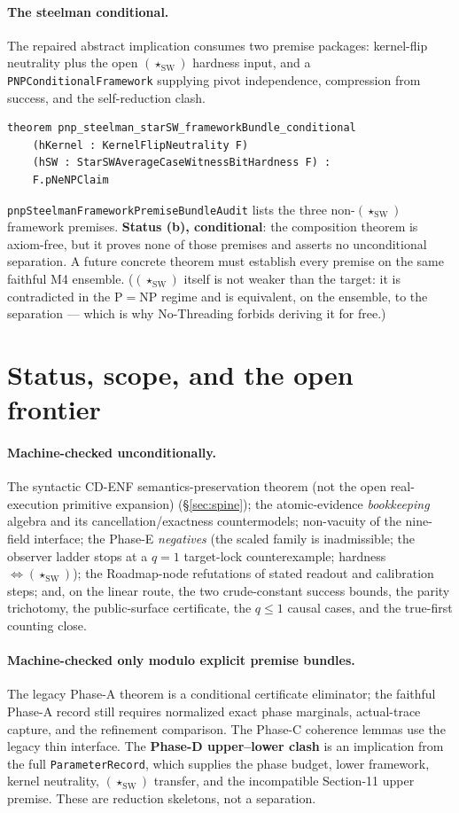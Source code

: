 \documentclass[11pt]{article}
\theoremstyle{definition}
\newcommand{\StarSW}{(\star_{\mathrm{SW}})}
\begin{document}
\paragraph{The steelman conditional.} The repaired abstract implication consumes
two premise packages: kernel-flip neutrality plus the open $\StarSW$ hardness
input, and a \texttt{PNPConditionalFramework} supplying pivot independence,
compression from success, and the self-reduction clash.
\begin{lstlisting}
theorem pnp_steelman_starSW_frameworkBundle_conditional
    (hKernel : KernelFlipNeutrality F)
    (hSW : StarSWAverageCaseWitnessBitHardness F) :
    F.pNeNPClaim
\end{lstlisting}
\texttt{pnpSteelmanFrameworkPremiseBundleAudit} lists the three non-$\StarSW$
framework premises.  \textbf{Status (b), conditional}: the composition theorem is
axiom-free, but it proves none of those premises and asserts no unconditional
separation.  A future concrete theorem must establish every premise on the same
faithful M4 ensemble.  ($\StarSW$ itself is not weaker than the target: it is
contradicted in the $\mathrm{P}=\mathrm{NP}$ regime and is equivalent, on the
ensemble, to the separation --- which is why No-Threading forbids deriving it for
free.)

\section{Status, scope, and the open frontier}
\label{sec:scope}

\paragraph{Machine-checked unconditionally.} The syntactic CD-ENF
semantics-preservation theorem (not the open real-execution primitive expansion)
(\S\ref{sec:spine}); the atomic-evidence \emph{bookkeeping} algebra and its
cancellation/exactness countermodels; non-vacuity of the nine-field interface; the
Phase-E \emph{negatives} (the scaled family is inadmissible; the observer ladder
stops at a $q=1$ target-lock counterexample; hardness $\Leftrightarrow\StarSW$);
the Roadmap-node refutations of stated readout and calibration steps; and, on the
linear route, the two crude-constant success bounds, the parity trichotomy, the
public-surface certificate, the $q\le1$ causal cases, and the true-first counting
close.

\paragraph{Machine-checked only modulo explicit premise bundles.} The legacy
Phase-A theorem is a conditional certificate eliminator; the faithful Phase-A
record still requires normalized exact phase marginals, actual-trace capture, and
the refinement comparison.  The Phase-C coherence lemmas use the legacy thin
interface.  The \textbf{Phase-D upper--lower clash} is an implication from the full
\texttt{ParameterRecord}, which supplies the phase budget, lower framework, kernel
neutrality, $\StarSW$ transfer, and the incompatible Section-11 upper premise.
These are reduction skeletons, not a separation.
\end{document}
